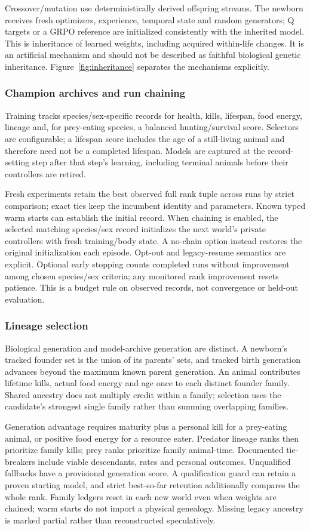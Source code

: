 Crossover/mutation use deterministically derived offspring streams. The newborn
receives fresh optimizers, experience, temporal state and random generators;
Q targets or a GRPO reference are initialized consistently with the inherited
model. This is inheritance of learned weights, including acquired within-life
changes. It is an artificial mechanism and should not be described as faithful
biological genetic inheritance. Figure~\ref{fig:inheritance} separates the
mechanisms explicitly.

\subsubsection{Champion archives and run chaining}
Training tracks species/sex-specific records for health, kills, lifespan, food
energy, lineage and, for prey-eating species, a balanced hunting/survival score.
Selectors are configurable; a lifespan score includes the age of a still-living
animal and therefore need not be a completed lifespan. Models are captured at
the record-setting step after that step's learning, including terminal animals
before their controllers are retired.

Fresh experiments retain the best observed full rank tuple across runs by
strict comparison; exact ties keep the incumbent identity and parameters.
Known typed warm starts can establish the initial record. When chaining is
enabled, the selected matching species/sex record initializes the next world's
private controllers with fresh training/body state. A no-chain option instead
restores the original initialization each episode. Opt-out and legacy-resume
semantics are explicit. Optional early stopping counts completed runs without
improvement among chosen species/sex criteria; any monitored rank improvement
resets patience. This is a budget rule on observed records, not convergence or
held-out evaluation.

\subsubsection{Lineage selection}
Biological generation and model-archive generation are distinct. A newborn's
tracked founder set is the union of its parents' sets, and tracked birth
generation advances beyond the maximum known parent generation. An animal
contributes lifetime kills, actual food energy and age once to each distinct
founder family. Shared ancestry does not multiply credit within a family;
selection uses the candidate's strongest single family rather than summing
overlapping families.

Generation advantage requires maturity plus a personal kill for a prey-eating
animal, or positive food energy for a resource eater. Predator lineage ranks
then prioritize family kills; prey ranks prioritize family animal-time.
Documented tie-breakers include viable descendants, rates and personal outcomes.
Unqualified fallbacks have a provisional generation score. A qualification guard
can retain a proven starting model, and strict best-so-far retention additionally
compares the whole rank. Family ledgers reset in each new world even when weights
are chained; warm starts do not import a physical genealogy. Missing legacy
ancestry is marked partial rather than reconstructed speculatively.
